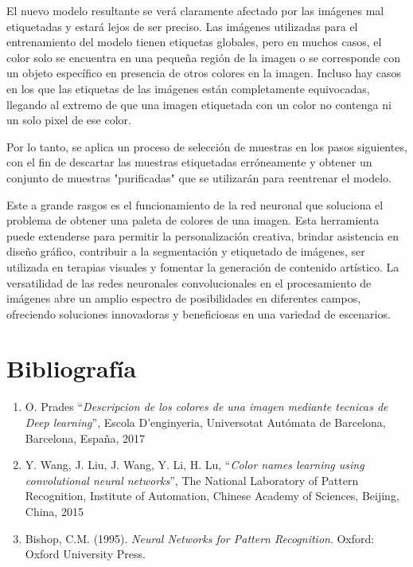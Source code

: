 \documentclass[14pt,a4paper]{report}
\begin{document}
El nuevo modelo resultante se verá claramente afectado por las imágenes mal etiquetadas y estará lejos de ser preciso. Las imágenes utilizadas para el entrenamiento del modelo tienen etiquetas globales, pero en muchos casos, el color solo se encuentra en una pequeña región de la imagen o se corresponde con un objeto específico en presencia de otros colores en la imagen. Incluso hay casos en los que las etiquetas de las imágenes están completamente equivocadas, llegando al extremo de que una imagen etiquetada con un color no contenga ni un solo pixel de ese color.

Por lo tanto, se aplica un proceso de selección de muestras en los pasos siguientes, con el fin de descartar las muestras etiquetadas erróneamente y obtener un conjunto de muestras "purificadas" que se utilizarán para reentrenar el modelo.

Este a grande rasgos es el funcionamiento de la red neuronal que soluciona el problema de obtener una paleta de colores de una imagen.  Esta herramienta puede extenderse para permitir la personalización creativa, brindar asistencia en diseño gráfico, contribuir a la segmentación y etiquetado de imágenes, ser utilizada en terapias visuales y fomentar la generación de contenido artístico. La versatilidad de las redes neuronales convolucionales en el procesamiento de imágenes abre un amplio espectro de posibilidades en diferentes campos, ofreciendo soluciones innovadoras y beneficiosas en una variedad de escenarios.



\newpage
\section*{Bibliografía}
\begin{enumerate}
\item O. Prades “\textit{Descripcion de los colores de una imagen mediante tecnicas de Deep learning}”, Escola D’enginyeria, Universotat Autómata de Barcelona, Barcelona, España, 2017

\item Y. Wang, J. Liu, J. Wang, Y. Li, H. Lu, “\textit{Color names learning using convolutional neural networks}”, The National Laboratory of Pattern Recognition, Institute of Automation, Chinese Academy of Sciences, Beijing, China, 2015

\item Bishop, C.M. (1995). \textit{Neural Networks for Pattern Recognition}. Oxford: Oxford University Press.

\end{enumerate}
\end{document}
